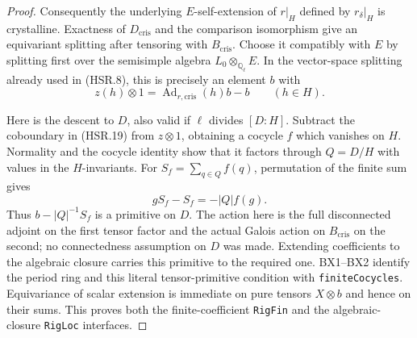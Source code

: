 \documentclass[11pt,a4paper]{article}
\numberwithin{equation}{section}
\theoremstyle{remark}\newtheorem{remark}[theorem]{Remark}
\begin{document}
\begin{proof}
Consequently the underlying $E$-self-extension of $r|_H$ defined
by $r_\delta|_H$ is crystalline.  Exactness of $D_{\mathrm{cris}}$
and the comparison isomorphism give an equivariant splitting after
tensoring with $B_{\mathrm{cris}}$.  Choose it compatibly with $E$
by splitting first over the semisimple algebra
$L_0\otimes_{\mathbb Q_\ell}E$.  In the vector-space splitting
already used in (HSR.8), this is precisely an element $b$ with
\[
 z(h)\otimes1=\operatorname{Ad}_{r,\mathrm{cris}}(h)b-b
                  \qquad(h\in H).
 \tag{HSR.19}
\]

Here is the descent to $D$, also valid if $\ell$ divides $[D:H]$.
Subtract the coboundary in (HSR.19) from $z\otimes1$, obtaining
a cocycle $f$ which vanishes on $H$.  Normality and the cocycle
identity show that it factors through $Q=D/H$ with values in
the $H$-invariants.  For $S_f=\sum_{q\in Q}f(q)$, permutation
of the finite sum gives
\[
                  gS_f-S_f=-|Q|f(g).
\]
Thus $b-|Q|^{-1}S_f$ is a primitive on $D$.  The action here is
the full disconnected adjoint on the first tensor factor and
the actual Galois action on $B_{\mathrm{cris}}$ on the second;
no connectedness assumption on $D$ was made.  Extending
coefficients to the algebraic closure carries this primitive to
the required one.  BX1--BX2 identify the period ring and this
literal tensor-primitive condition with \texttt{finite\allowbreak Cocycles}.
Equivariance of scalar extension is immediate on pure tensors
$X\otimes b$ and hence on their sums.  This proves both the
finite-coefficient \texttt{Rig\allowbreak Fin} and the algebraic-closure
\texttt{Rig\allowbreak Loc} interfaces.
\end{proof}
\end{document}
